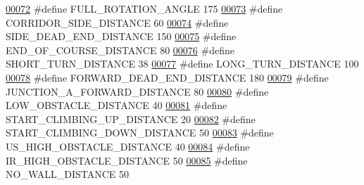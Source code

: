 \begin{DoxyCode}
\hypertarget{state__machine_8h_source.tex_l00072}{}\hyperlink{state__machine_8h_a40718a26b2b107afdc38533db41cc0a3}{00072} \textcolor{preprocessor}{#define FULL\_ROTATION\_ANGLE 175         }
\hypertarget{state__machine_8h_source.tex_l00073}{}\hyperlink{state__machine_8h_a201d56046ddf552d57b4862e0ec07a10}{00073} \textcolor{preprocessor}{#define CORRIDOR\_SIDE\_DISTANCE 60       }
\hypertarget{state__machine_8h_source.tex_l00074}{}\hyperlink{state__machine_8h_a31ba7e3e0116f665d5825f669052ed09}{00074} \textcolor{preprocessor}{#define SIDE\_DEAD\_END\_DISTANCE 150      }
\hypertarget{state__machine_8h_source.tex_l00075}{}\hyperlink{state__machine_8h_a9a1286b84f437e1c90d21ffc833a8b79}{00075} \textcolor{preprocessor}{#define END\_OF\_COURSE\_DISTANCE 80       }
\hypertarget{state__machine_8h_source.tex_l00076}{}\hyperlink{state__machine_8h_adf843098ef425aa129f5ff16d879f7f2}{00076} \textcolor{preprocessor}{#define SHORT\_TURN\_DISTANCE 38          }
\hypertarget{state__machine_8h_source.tex_l00077}{}\hyperlink{state__machine_8h_a365e437f4fdaddff7b28fa56e61a0060}{00077} \textcolor{preprocessor}{#define LONG\_TURN\_DISTANCE 100          }
\hypertarget{state__machine_8h_source.tex_l00078}{}\hyperlink{state__machine_8h_a8118fdbf1a36265000f2d42844e10747}{00078} \textcolor{preprocessor}{#define FORWARD\_DEAD\_END\_DISTANCE 180   }
\hypertarget{state__machine_8h_source.tex_l00079}{}\hyperlink{state__machine_8h_ada224a95ca04ac21b410ef6e23814eea}{00079} \textcolor{preprocessor}{#define JUNCTION\_A\_FORWARD\_DISTANCE 80  }
\hypertarget{state__machine_8h_source.tex_l00080}{}\hyperlink{state__machine_8h_a29b3e85ce789185a96d28f139e003d4c}{00080} \textcolor{preprocessor}{#define LOW\_OBSTACLE\_DISTANCE 40        }
\hypertarget{state__machine_8h_source.tex_l00081}{}\hyperlink{state__machine_8h_a7dc7e4111003eb72dfc6cfede130fb5f}{00081} \textcolor{preprocessor}{#define START\_CLIMBING\_UP\_DISTANCE 20   }
\hypertarget{state__machine_8h_source.tex_l00082}{}\hyperlink{state__machine_8h_a9df2253e22c049d64aab5f0cbfd7dae3}{00082} \textcolor{preprocessor}{#define START\_CLIMBING\_DOWN\_DISTANCE 50 }
\hypertarget{state__machine_8h_source.tex_l00083}{}\hyperlink{state__machine_8h_a647ce7a809da5ed12ea5319ed1c2b73f}{00083} \textcolor{preprocessor}{#define US\_HIGH\_OBSTACLE\_DISTANCE 40    }
\hypertarget{state__machine_8h_source.tex_l00084}{}\hyperlink{state__machine_8h_a83b61a7a575cb23097805af83236bcf0}{00084} \textcolor{preprocessor}{#define IR\_HIGH\_OBSTACLE\_DISTANCE 50    }
\hypertarget{state__machine_8h_source.tex_l00085}{}\hyperlink{state__machine_8h_a9d981c215ebe94b6be6a0d49ccd2dce8}{00085} \textcolor{preprocessor}{#define NO\_WALL\_DISTANCE 50             }

\end{DoxyCode}

